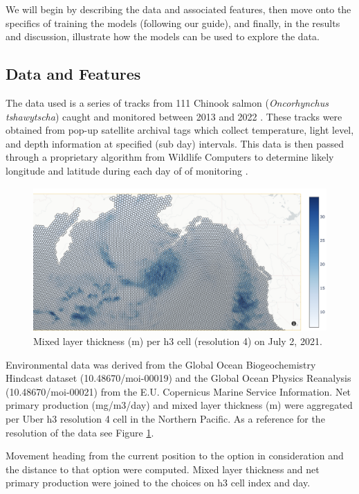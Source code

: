 \documentclass[11pt]{article}
\begin{document}
We will begin by describing the data and associated features, then move onto the specifics of training the models (following our guide), and finally, in the results and discussion, illustrate how the models can be used to explore the data. 

\subsection*{Data and Features}

The data used is a series of tracks from 111 Chinook salmon (\textit{Oncorhynchus tshawytscha}) caught and monitored between 2013 and 2022 \citep{tags1} \citep{tags2}. These tracks were obtained from pop-up satellite archival tags which collect temperature, light level, and depth information at specified (sub day) intervals. This data is then passed through a proprietary algorithm from Wildlife Computers to determine likely longitude and latitude during each day of of monitoring \citep{PSAT}. \newline

\begin{figure}[h!] 
	\centering
  \includegraphics[height=55mm]{figures/mlt_2021_07_02.png}
  \caption{Mixed layer thickness (m) per h3 cell (resolution 4) on July 2, 2021.}
  \label{fig:mlt}
\end{figure}

Environmental data was derived from the Global Ocean Biogeochemistry Hindcast dataset (10.48670/moi-00019) and the Global Ocean Physics Reanalysis (10.48670/moi-00021) from the E.U. Copernicus Marine Service Information. Net primary production (mg/m3/day) and mixed layer thickness (m) were aggregated per Uber h3 resolution 4 cell in the Northern Pacific. As a reference for the resolution of the data see Figure \ref{fig:mlt}. \newline

Movement heading from the current position to the option in consideration and the distance to that option were computed. Mixed layer thickness and net primary production were joined to the choices on h3 cell index and day.
\end{document}
